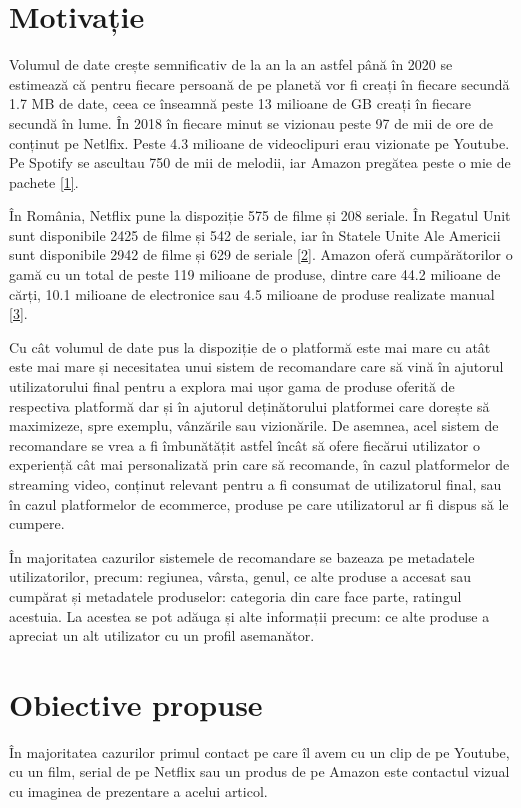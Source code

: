 \section{Motivație}

Volumul de date crește semnificativ de la an la an astfel până în 2020 se estimează că pentru fiecare persoană de pe planetă vor fi creați în fiecare secundă 1.7 MB de date, ceea ce înseamnă peste 13 milioane de GB creați în fiecare secundă în lume. În 2018 în fiecare minut se vizionau peste 97 de mii de ore de conținut pe Netlfix. Peste 4.3 milioane de videoclipuri erau vizionate pe Youtube. Pe Spotify se ascultau 750 de mii de melodii, iar Amazon pregătea peste o mie de pachete \hyperlink{domo}{[1]}.

În România, Netflix pune la dispoziție 575 de filme și 208 seriale. În Regatul Unit sunt disponibile 2425 de filme și 542 de seriale, iar în Statele Unite Ale Americii sunt disponibile 2942 de filme și 629 de seriale \hyperlink{finder}{[2]}. Amazon oferă cumpărătorilor o gamă cu un total de peste 119 milioane de produse, dintre care 44.2 milioane de cărți, 10.1 milioane de electronice sau 4.5 milioane de produse realizate manual \hyperlink{scrapehero}{[3]}.

Cu cât volumul de date pus la dispoziție de o platformă este mai mare cu atât este mai mare și necesitatea unui sistem de recomandare care să vină în ajutorul utilizatorului final pentru a explora mai ușor gama de produse oferită de respectiva platformă dar și în ajutorul deținătorului platformei care dorește să maximizeze, spre exemplu, vânzările sau vizionările. De asemnea, acel sistem de recomandare se vrea a fi îmbunătățit astfel încât să ofere fiecărui utilizator o experiență cât mai personalizată prin care să recomande, în cazul platformelor de streaming video, conținut relevant pentru a fi consumat de utilizatorul final, sau în cazul platformelor de ecommerce, produse pe care utilizatorul ar fi dispus să le cumpere.

În majoritatea cazurilor sistemele de recomandare se bazeaza pe metadatele utilizatorilor, precum: regiunea, vârsta, genul, ce alte produse a accesat sau cumpărat și metadatele produselor: categoria din care face parte, ratingul acestuia. La acestea se pot adăuga și alte informații precum: ce alte produse a apreciat un alt utilizator cu un profil asemanător.

\section{Obiective propuse}
În majoritatea cazurilor primul contact pe care îl avem cu un clip de pe Youtube, cu un film, serial de pe Netflix sau un produs de pe Amazon este contactul vizual cu imaginea de prezentare a acelui articol. 

